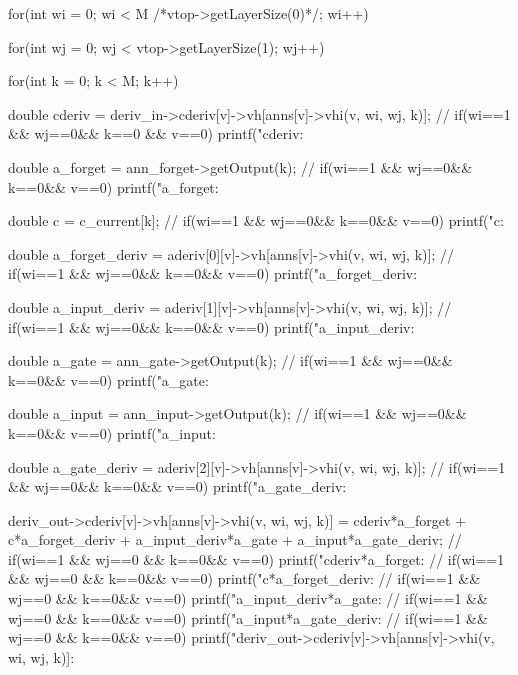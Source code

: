 {{    for(int wi = 0; wi < M /*vtop->getLayerSize(0)*/; wi++){
      for(int wj = 0; wj < vtop->getLayerSize(1); wj++){

        for(int k = 0; k < M; k++){

          double cderiv = deriv\_in->cderiv[v]->vh[anns[v]->vhi(v, wi, wj, k)];
          // if(wi==1 \&\& wj==0\&\& k==0 \&\& v==0) printf("cderiv: %

          double a\_forget = ann\_forget->getOutput(k);
          // if(wi==1 \&\& wj==0\&\& k==0\&\& v==0) printf("a\_forget: %

          double c = c\_current[k];
          // if(wi==1 \&\& wj==0\&\& k==0\&\& v==0) printf("c: %

          double a\_forget\_deriv = aderiv[0][v]->vh[anns[v]->vhi(v, wi, wj, k)];
          // if(wi==1 \&\& wj==0\&\& k==0\&\& v==0) printf("a\_forget\_deriv: %

          double a\_input\_deriv = aderiv[1][v]->vh[anns[v]->vhi(v, wi, wj, k)];
          // if(wi==1 \&\& wj==0\&\& k==0\&\& v==0) printf("a\_input\_deriv: %

          double a\_gate = ann\_gate->getOutput(k);
          // if(wi==1 \&\& wj==0\&\& k==0\&\& v==0) printf("a\_gate: %

          double a\_input = ann\_input->getOutput(k);
          // if(wi==1 \&\& wj==0\&\& k==0\&\& v==0) printf("a\_input: %

          double a\_gate\_deriv = aderiv[2][v]->vh[anns[v]->vhi(v, wi, wj, k)];
          // if(wi==1 \&\& wj==0\&\& k==0\&\& v==0) printf("a\_gate\_deriv: %

          deriv\_out->cderiv[v]->vh[anns[v]->vhi(v, wi, wj, k)] = cderiv*a\_forget + c*a\_forget\_deriv + a\_input\_deriv*a\_gate + a\_input*a\_gate\_deriv;
          // if(wi==1 \&\& wj==0 \&\& k==0\&\& v==0) printf("cderiv*a\_forget:  %
          // if(wi==1 \&\& wj==0 \&\& k==0\&\& v==0) printf("c*a\_forget\_deriv:  %
          // if(wi==1 \&\& wj==0 \&\& k==0\&\& v==0) printf("a\_input\_deriv*a\_gate:  %
          // if(wi==1 \&\& wj==0 \&\& k==0\&\& v==0) printf("a\_input*a\_gate\_deriv:  %
          // if(wi==1 \&\& wj==0 \&\& k==0\&\& v==0) printf("deriv\_out->cderiv[v]->vh[anns[v]->vhi(v, wi, wj, k)]: %
        }
      }
    }
  }

}
